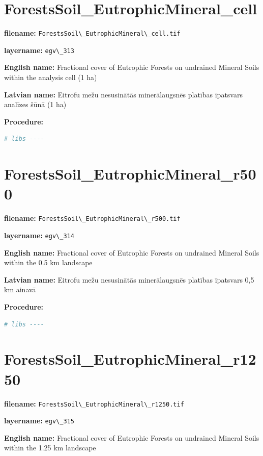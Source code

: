 \documentclass[
]{book}
\newcommand{\passthrough}[1]{#1}
\begin{document}
\section{ForestsSoil\_EutrophicMineral\_cell}\label{ch06.313}

\textbf{filename:} \passthrough{\lstinline!ForestsSoil\_EutrophicMineral\_cell.tif!}

\textbf{layername:} \passthrough{\lstinline!egv\_313!}

\textbf{English name:} Fractional cover of Eutrophic Forests on undrained Mineral Soils within the analysis cell (1 ha)

\textbf{Latvian name:} Eitrofu mežu nesusinātās minerālaugsnēs platības īpatsvars analīzes šūnā (1 ha)

\textbf{Procedure:}

\begin{lstlisting}[language=R]
# libs ----
\end{lstlisting}

\section{ForestsSoil\_EutrophicMineral\_r500}\label{ch06.314}

\textbf{filename:} \passthrough{\lstinline!ForestsSoil\_EutrophicMineral\_r500.tif!}

\textbf{layername:} \passthrough{\lstinline!egv\_314!}

\textbf{English name:} Fractional cover of Eutrophic Forests on undrained Mineral Soils within the 0.5 km landscape

\textbf{Latvian name:} Eitrofu mežu nesusinātās minerālaugsnēs platības īpatsvars 0,5 km ainavā

\textbf{Procedure:}

\begin{lstlisting}[language=R]
# libs ----
\end{lstlisting}

\section{ForestsSoil\_EutrophicMineral\_r1250}\label{ch06.315}

\textbf{filename:} \passthrough{\lstinline!ForestsSoil\_EutrophicMineral\_r1250.tif!}

\textbf{layername:} \passthrough{\lstinline!egv\_315!}

\textbf{English name:} Fractional cover of Eutrophic Forests on undrained Mineral Soils within the 1.25 km landscape
\end{document}
